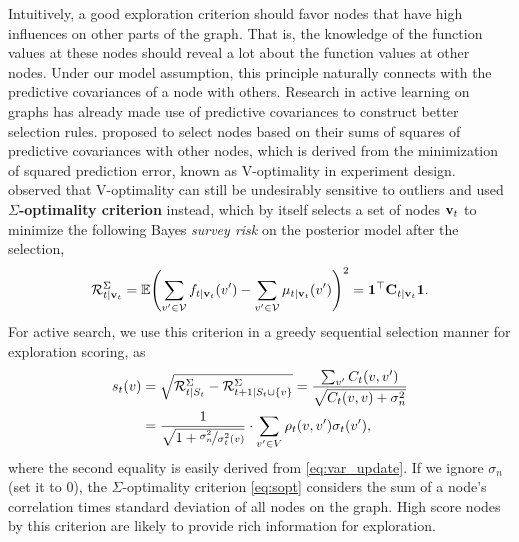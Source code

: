 Intuitively, a good exploration criterion should favor nodes that have high influences on other parts of the graph.
That is, the knowledge of the function values at these nodes should reveal a lot about the function values at other nodes.
Under our model assumption, this principle naturally connects with the predictive covariances of a node with others. Research in active learning 
on graphs has already made use of predictive covariances to construct better selection rules. \cite{mingji} 
proposed to select nodes based on their sums of squares of predictive covariances with other nodes, which is derived 
from the minimization of squared prediction error, known as V-optimality in experiment design. \cite{ma_2013} 
observed that V-optimality can still be undesirably sensitive to outliers and used \textbf{$\Sigma$-optimality criterion} instead, 
which by itself selects a set of nodes $\mathbf{v}_t$ to minimize the following Bayes \textit{survey risk} on the posterior model after the selection, 
\begin{equation*}
	\mathcal{R}^\Sigma_{t\mid\mathbf{v}_t} = \mathbb{E} \Biggl(
	\sum_{v'\in\mathcal{V}} f_{t\mid\mathbf{v}_t}(v') -
	\sum_{v'\in\mathcal{V}} \mu_{t\mid\mathbf{v}_t}(v') 
	\Biggr)^2
	=\mathbf 1^\top{\mathbf C}_{t\mid\mathbf{v}_t}\mathbf 1.
\end{equation*}
For active search, we use this criterion in a greedy sequential selection manner for exploration scoring, as
\begin{align}
  s_t(v) &= \sqrt{\mathcal{R}^\Sigma_{t\mid S_t} -	\mathcal{R}^\Sigma_{t+1\mid S_t\cup\{v\}} }
  =	
 	\frac{ \sum_{v'} C_t(v,v')}{ \sqrt{C_t(v,v) + \sigma_n^2}}
 	\nonumber
 	\\
	&= \frac{1}{\sqrt{1+\nicefrac{\sigma_n^2}{\sigma_t^2(v)}}}
	\cdot
	\sum_{v'\in V}\rho_t(v,v')\sigma_t(v'),
	\label{eq:sopt}
\end{align}
where the second equality is easily derived from \eqref{eq:var_update}.
If we ignore $\sigma_n$ (set it to $0$), the $\Sigma$-optimality criterion \eqref{eq:sopt} considers the sum 
of a node's correlation times standard deviation of all nodes on the graph. High score nodes by this criterion are likely to provide rich
information for exploration.

